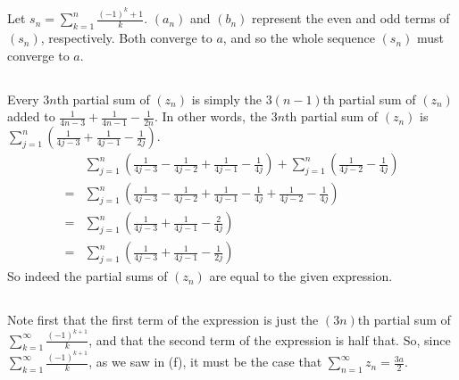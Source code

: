 \documentclass[11pt]{article}
\begin{document}
\subsection{} %
Let $s_n=\sum_{k=1}^n\frac{(-1)^k+1}{k}$.
$(a_n)$ and $(b_n)$ represent the even and odd terms of $(s_n)$, respectively.
Both converge to $a$, and so the whole sequence $(s_n)$ must converge to $a$.


\subsection{} %
Every $3n$th partial sum of $(z_n)$ is simply the $3(n-1)$th partial sum of $(z_n)$ added to $\frac{1}{4n-3}+\frac{1}{4n-1}-\frac{1}{2n}$.
In other words, the $3n$th partial sum of $(z_n)$ is $\sum_{j=1}^n\left(\frac{1}{4j-3}+\frac{1}{4j-1}-\frac{1}{2j}\right)$.
\begin{align*}
	&\sum_{j=1}^n\left(\frac{1}{4j-3}-\frac{1}{4j-2}+\frac{1}{4j-1}-\frac{1}{4j}\right) + \sum_{j=1}^n\left(\frac{1}{4j-2}-\frac{1}{4j}\right)\\
	= &\sum_{j=1}^n\left(\frac{1}{4j-3}-\frac{1}{4j-2}+\frac{1}{4j-1}-\frac{1}{4j}+\frac{1}{4j-2}-\frac{1}{4j}\right)\\
	= &\sum_{j=1}^n\left(\frac{1}{4j-3}+\frac{1}{4j-1}-\frac{2}{4j}\right)\\
	= &\sum_{j=1}^n\left(\frac{1}{4j-3}+\frac{1}{4j-1}-\frac{1}{2j}\right)
\end{align*}
So indeed the partial sums of $(z_n)$ are equal to the given expression.


\subsection{} %
Note first that the first term of the expression is just the $(3n)$th partial sum of $\sum_{k=1}^\infty\frac{(-1)^{k+1}}{k}$, and that the second term of the expression is half that.
So, since $\sum_{k=1}^\infty\frac{(-1)^{k+1}}{k}$, as we saw in (f), it must be the case that $\sum_{n=1}^\infty z_n=\frac{3a}{2}$.
\end{document}
